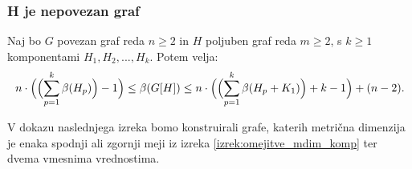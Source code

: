 \documentclass[mat1, tisk]{fmfdelo}
\newcommand{\1}{(1, 1, ..., 1)}
\newcommand{\2}{(2, 2, ..., 2)}
\begin{document}
        
        





\subsubsection{H je nepovezan graf} \label{sss:nepovezan}


\begin{izrek} \label{izrek:omejitve_mdim_komp}
    Naj bo $G$ povezan graf reda $n \geq 2$ in $H$ poljuben graf reda $m \geq 2$, s $k \geq 1$ 
    komponentami $H_1, H_2, ... , H_k$. Potem velja:
    $$
    n \cdot \Bigl ( \Bigl ( \sum_{p=1}^{k} \beta(H_p) \Bigr )  - 1  \Bigr ) 
    \leq \beta(G[H]) \leq 
    n \cdot \Bigl ( \Bigl ( \sum_{p=1}^{k} \beta(H_p + K_1) \Bigr ) + k - 1  \Bigr ) + (n-2). 
    $$
    \end{izrek}
    
    
    V dokazu naslednjega izreka bomo konstruirali grafe, katerih metrična dimenzija je enaka
    spodnji ali zgornji meji iz izreka \ref{izrek:omejitve_mdim_komp} ter dvema vmesnima vrednostima.
    
\end{document}
